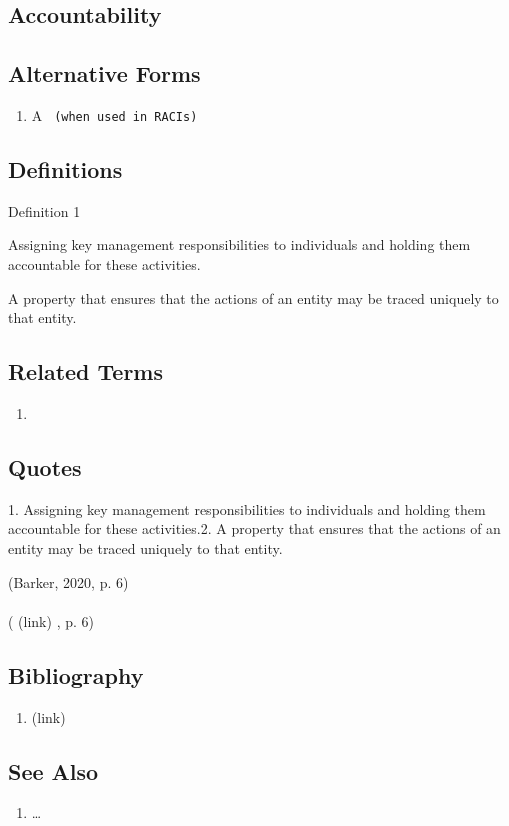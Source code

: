 \newpage \subsection*{Accountability } \subsection*{Alternative Forms } \begin{enumerate} \item  A  \texttt{ (when used in RACIs)  } \end{enumerate} \subsection*{Definitions } \begin{DIC_Def}{Definition 1 }{} \item  Assigning key management responsibilities to individuals and holding them accountable for these activities.  \item  A property that ensures that the actions of an entity may be traced uniquely to that entity.  \end{DIC_Def} \subsection*{Related Terms } \begin{enumerate} \item  \end{enumerate} \subsection*{Quotes } \begin{DIC_BlockQuote} 1. Assigning key management responsibilities to individuals and holding them accountable for these activities.2. A property that ensures that the actions of an entity may be traced uniquely to that entity.  \end{DIC_BlockQuote} (Barker, 2020, p. 6)  \paragraph{} (  (link) \href{Barker, 2020 }{ } , p. 6)  \subsection*{Bibliography } \begin{enumerate} \item  (link) \href{Barker, 2020 }{ }   \end{enumerate} \subsection*{See Also } \begin{enumerate} \item  \ldots{}  \end{enumerate} 